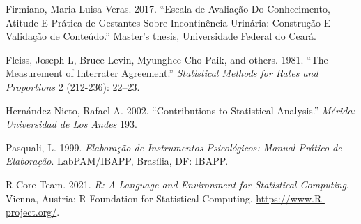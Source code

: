 \documentclass[
]{article}
\newlength{\cslhangindent}
\newenvironment{cslreferences}%
  {\setlength{\parindent}{0pt}%
  \everypar{\setlength{\hangindent}{\cslhangindent}}\ignorespaces}%
  {\par}
\begin{document}
\hypertarget{refs}{}
\begin{cslreferences}
\leavevmode\hypertarget{ref-firmiano2017escala}{}%
Firmiano, Maria Luisa Veras. 2017. ``Escala de Avaliação Do Conhecimento, Atitude E Prática de Gestantes Sobre Incontinência Urinária: Construção E Validação de Conteúdo.'' Master's thesis, Universidade Federal do Ceará.

\leavevmode\hypertarget{ref-fleiss1981measurement}{}%
Fleiss, Joseph L, Bruce Levin, Myunghee Cho Paik, and others. 1981. ``The Measurement of Interrater Agreement.'' \emph{Statistical Methods for Rates and Proportions} 2 (212-236): 22--23.

\leavevmode\hypertarget{ref-hernandez2002contributions}{}%
Hernández-Nieto, Rafael A. 2002. ``Contributions to Statistical Analysis.'' \emph{Mérida: Universidad de Los Andes} 193.

\leavevmode\hypertarget{ref-pasquali1999elaboraccao}{}%
Pasquali, L. 1999. \emph{Elaboração de Instrumentos Psicológicos: Manual Prático de Elaboração}. LabPAM/IBAPP, Brasília, DF: IBAPP.

\leavevmode\hypertarget{ref-Rlang}{}%
R Core Team. 2021. \emph{R: A Language and Environment for Statistical Computing}. Vienna, Austria: R Foundation for Statistical Computing. \url{https://www.R-project.org/}.
\end{cslreferences}
\end{document}
